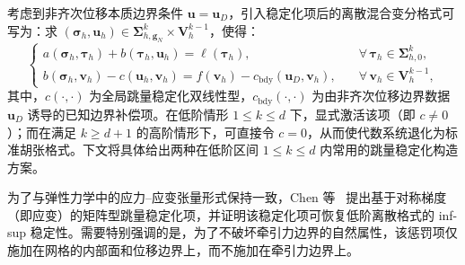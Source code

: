 考虑到非齐次位移本质边界条件 $\boldsymbol{u} = \boldsymbol{u}_D$，引入稳定化项后的离散混合变分格式可写为：求 $(\boldsymbol{\sigma}_h,\boldsymbol{u}_h)\in \boldsymbol{\Sigma}_{h,\boldsymbol{g}_N}^k\times \boldsymbol{V}_h^{k-1}$，使得：
\begin{equation} \label{eq:ch5_stabilized_weak_form}
	\begin{cases}
		a(\boldsymbol{\sigma}_h,\boldsymbol{\tau}_h)+b(\boldsymbol{\tau}_h,\boldsymbol{u}_h)=\ell(\boldsymbol{\tau}_h),&\quad \forall\,\boldsymbol{\tau}_h\in\boldsymbol{\Sigma}_{h,0}^k,\\
		b(\boldsymbol{\sigma}_h,\boldsymbol{v}_h) - c(\boldsymbol{u}_h,\boldsymbol{v}_h)= f(\boldsymbol{v}_h) - c_{\text{bdy}}(\boldsymbol{u}_D, \boldsymbol{v}_h),&\quad \forall\,\boldsymbol{v}_h\in\boldsymbol{V}_{h}^{k-1},
	\end{cases}
\end{equation}
其中，$c(\cdot,\cdot)$ 为全局跳量稳定化双线性型，$c_{\text{bdy}}(\cdot,\cdot)$ 为由非齐次位移边界数据 $\boldsymbol{u}_D$ 诱导的已知边界补偿项。在低阶情形 $1\le k\le d$ 下，显式激活该项（即 $c \neq 0$）；而在满足 $k\ge d+1$ 的高阶情形下，可直接令 $c=0$，从而使代数系统退化为标准胡张格式。下文将具体给出两种在低阶区间 $1\le k\le d$ 内常用的跳量稳定化构造方案。

为了与弹性力学中的应力{--}应变张量形式保持一致，Chen 等~\cite{chenStabilizedMixedFinite2017a} 提出基于对称梯度（即应变）的矩阵型跳量稳定化项，并证明该稳定化项可恢复低阶离散格式的 inf-sup 稳定性。需要特别强调的是，为了不破坏牵引力边界的自然属性，该惩罚项仅施加在网格的内部面和位移边界上，而不施加在牵引力边界上。

